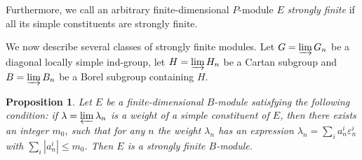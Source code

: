 \documentclass[12pt]{article}
\newtheorem{prop}[theorem]{Proposition}
\begin{document}
Furthermore, we call an arbitrary finite-dimensional $P$-module $E$ \textit{strongly finite} if all its simple constituents are strongly finite.  

We now describe several classes of strongly finite modules. 
Let $G = \varinjlim G_n$ be a diagonal locally simple ind-group, let $H = \varinjlim H_n$ be a Cartan subgroup and $B = \varinjlim B_n$ be a Borel subgroup containing $H$. 
 
\begin{prop} \label{prop_StrFiniteDiagCase}%
Let $E$ be a finite-dimensional $B$-module satisfying the following condition: if $\lambda = \varprojlim \lambda_n$ is a weight of a simple constituent of $E$, then there exists an integer $m_0$, such that for any $n$ the weight $\lambda_n$ has an expression $\lambda_n = \sum_i a_n^i \varepsilon_n^i$ with $\sum_i |a_n^i| \leq m_0$. Then $E$ is a strongly finite $B$-module.
\end{prop}
\end{document}
